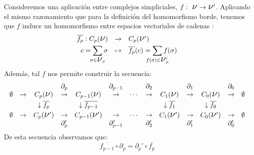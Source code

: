\documentclass[12pt, a4paper, twoside]{book}
\numberwithin{equation}{section}
\theoremstyle{definition}
\theoremstyle{remark}
\theoremstyle{plain}
\begin{document}
	Consideremos una aplicación entre complejos simpliciales, $f:\text{
	{\Large $\nu$}}\rightarrow\text{{\Large $\nu$}}'$. Aplicando el mismo 
	razonamiento que para la definición del homomorfismo borde, tenemos 
	que $f$ induce un homomorfismo entre espacios vectoriales de cadenas :
	\begin{equation}
		\label{hom:induc}
		\left.
		\begin{array}{lll}
			\overline{f_{p}}:C_{p}(\text{{\Large $\nu$}}) & 
				\rightarrow & C_{p}(\text{{\Large $\nu$}}')
				\\[3pt] 
			\multicolumn{1}{r}{c=\displaystyle \sum_{\mathclap{
			\sigma \in \text{{\Large $\nu$}$_{p}$}}}\sigma} & 
			\mapsto & 
			\overline{f_{p}}(c)=\displaystyle \sum_{\mathclap{
			f(\sigma) \in \text{{\Large $\nu$}$_{p}'$}}}f(\sigma)
		\end{array}
		\right. 
	\end{equation}
	Además, tal $f$ nos permite construir la secuencia:
	\begin{equation}
		\label{hom: gruphom}
		 \left.
		\begin{array}{ccccccccccccc}
			 & & & \partial_{p} &  & 
			\partial_{p-1} &  & \partial_{2}&  & \partial_{1}&  & 
			\partial_{0} & \\ 
			\emptyset & \rightarrow & C_{p}(
			\text{{\Large $\nu$}}) & \rightarrow & C_{p-1}(
			\text{{\Large $\nu$}}) & \rightarrow &\cdots & 
			\rightarrow & C_{1}(
			\text{{\Large $\nu$}})& \rightarrow & C_{0}(
			\text{{\Large $\nu$}})& \rightarrow & \emptyset\\[3pt]

			 & & \downarrow \overline{f_{p}}& & \downarrow 
			\overline{f_{p-1}}& 
			 & & & \downarrow \overline{f_{1}}
			 & & \downarrow \overline{f_{0}} & & \\ [3pt]
			\emptyset & \rightarrow & C_{p}(
			\text{{\Large $\nu$}}') & \rightarrow & C_{p-1}(
			\text{{\Large $\nu$}}') & \rightarrow &\cdots & 
			\rightarrow & C_{1}(
			\text{{\Large $\nu$}}')& \rightarrow & C_{0}(
			\text{{\Large $\nu$}}')& \rightarrow & \emptyset \\
			 & & & \partial_{p}' &  & 
			\partial_{p-1}' &  & \partial_{2}' &  & \partial_{1}'&
					& \partial_{0}' &
		\end{array}
		\right. 
	\end{equation}
	De esta secuencia observamos que: 
	\begin{equation*}
		\overline{f_{p-1}}\circ\partial_{p}=
		\partial_{p}'\circ\overline{f_{p}} 
	\end{equation*}
\end{document}
